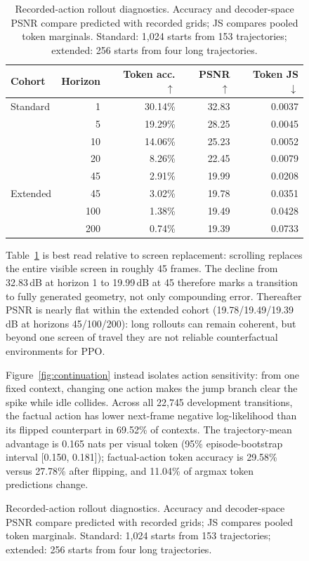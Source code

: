 \begin{figure}[!htbp]
\begin{table}[H]
  \centering
  \footnotesize
  \setlength{\tabcolsep}{4pt}
  \caption{Recorded-action rollout diagnostics. Accuracy and decoder-space PSNR compare predicted with recorded grids; JS compares pooled token marginals. Standard: 1,024 starts from 153 trajectories; extended: 256 starts from four long trajectories.}
  \label{tab:rollout-diagnostics}
  \begin{tabular}{lrrrr}
    \toprule
    Cohort & Horizon & Token acc. $\uparrow$ & PSNR $\uparrow$ & Token JS $\downarrow$ \\
    \midrule
    Standard & 1 & 30.14\% & 32.83 & 0.0037 \\
             & 5 & 19.29\% & 28.25 & 0.0045 \\
             & 10 & 14.06\% & 25.23 & 0.0052 \\
             & 20 & 8.26\% & 22.45 & 0.0079 \\
             & 45 & 2.91\% & 19.99 & 0.0208 \\
    \addlinespace
    Extended & 45 & 3.02\% & 19.78 & 0.0351 \\
             & 100 & 1.38\% & 19.49 & 0.0428 \\
             & 200 & 0.74\% & 19.39 & 0.0733 \\
    \bottomrule
  \end{tabular}
\end{table}

Table~\ref{tab:rollout-diagnostics} is best read relative to screen replacement: scrolling replaces the entire visible screen in roughly 45 frames.
The decline from 32.83\,dB at horizon 1 to 19.99\,dB at 45 therefore marks a transition to fully generated geometry, not only compounding error.
Thereafter PSNR is nearly flat within the extended cohort (19.78/19.49/19.39\,dB at horizons 45/100/200): long rollouts can remain coherent, but beyond one screen of travel they are not reliable counterfactual environments for PPO.

Figure~\ref{fig:continuation} instead isolates action sensitivity: from one fixed context, changing one action makes the jump branch clear the spike while idle collides.
Across all 22,745 development transitions, the factual action has lower next-frame negative log-likelihood than its flipped counterpart in 69.52\% of contexts.
The trajectory-mean advantage is 0.165 nats per visual token (95\% episode-bootstrap interval [0.150, 0.181]); factual-action token accuracy is 29.58\% versus 27.78\% after flipping, and 11.04\% of argmax token predictions change.


\end{figure}
